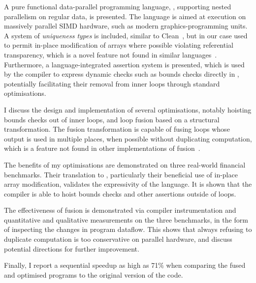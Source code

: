 A pure functional data-parallel programming language, \LO{},
supporting nested parallelism on regular data, is presented.  The
language is aimed at execution on massively parallel SIMD hardware,
such as modern graphics-programming units.  A system of
\textit{uniqueness types} is included, similar to
Clean~\cite{clean-uniqueness-types}, but in our case used to permit
in-place modification of arrays where possible violating referential
transparency, which is a novel feature not found in similar
languages~\cite{chakravarty2011accelerating,keller2010regular,mcdonell2013optimising}.
Furthermore, a language-integrated assertion system is presented,
which is used by the compiler to express dynamic checks such as bounds
checks directly in \LO{}, potentially facilitating their removal from
inner loops through standard optimisations.

I discuss the design and implementation of several optimisations,
notably hoisting bounds checks out of inner loops, and loop fusion
based on a structural transformation.  The fusion transformation is
capable of fusing loops whose output is used in multiple places, when
possible without duplicating computation, which is a feature not found
in other implementations of fusion~\cite{jones2001playing}.

The benefits of my optimisations are demonstrated on three real-world
financial benchmarks.  Their translation to \LO{}, particularly their
beneficial use of in-place array modification, validates the
expressivity of the language.  It is shown that the compiler is able
to hoist bounds checks and other assertions outside of loops.

The effectiveness of fusion is demonstrated via compiler
instrumentation and quantitative and qualitative measurements on the
three benchmarks, in the form of inspecting the changes in program
dataflow.  This shows that always refusing to duplicate computation is
too conservative on parallel hardware, and discuss potential
directions for further improvement.

Finally, I report a sequential speedup as high as 71\% when comparing
the fused and optimised programs to the original version of the code.

